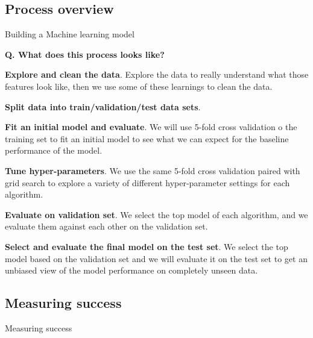 \subsection{Process overview}
\begin{transitionsubframe}
  \begin{center}
    \Huge Building a Machine learning model
  \end{center}
\end{transitionsubframe}

\begin{frame}[fragile]{\textbf{Q. What does this process looks like?}}
  \begin{wideitemize}
    \item \textbf{Explore and clean the data}. Explore the data to really understand
    what those features look like, then we use some of these learnings to clean the data.
    \item \textbf{Split data into train/validation/test data sets}.
    \item \textbf{Fit an initial model and evaluate}. We will use 5-fold cross
    validation o the training set to fit an initial model to see what we can expect
    for the baseline performance of the model.
    \item \textbf{Tune hyper-parameters}. We use the same 5-fold cross validation
    paired with grid search to explore a variety of different hyper-parameter settings
    for each algorithm.
    \item \textbf{Evaluate on validation set}. We select the top model of each
    algorithm, and we evaluate them against each other on the validation set.
    \item \textbf{Select and evaluate the final model on the test set}. We select
    the top model based on the validation set and we will evaluate it on the test
    set to get an unbiased view of the model performance on completely unseen data.
  \end{wideitemize}
\end{frame}

\subsection{Measuring success}
\begin{transitionsubframe}
  \begin{center}
    \Huge Measuring success
  \end{center}
\end{transitionsubframe}


